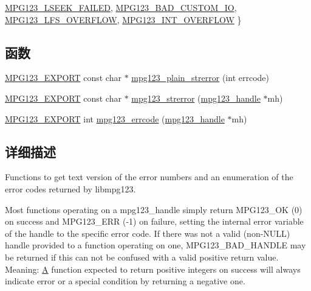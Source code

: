 \begin{DoxyCompactItemize}
\newline
\hyperlink{group__mpg123__error_ggac50432012aeaf7c23014de3198dfa5fda102bd78ff1fad6cce594e22ea6fb0698}{M\+P\+G123\+\_\+\+L\+S\+E\+E\+K\+\_\+\+F\+A\+I\+L\+ED}, 
\hyperlink{group__mpg123__error_ggac50432012aeaf7c23014de3198dfa5fda9968b3ba91db9dd166fa8421572bda52}{M\+P\+G123\+\_\+\+B\+A\+D\+\_\+\+C\+U\+S\+T\+O\+M\+\_\+\+IO}, 
\hyperlink{group__mpg123__error_ggac50432012aeaf7c23014de3198dfa5fda7ecc133213daa350d801a9e1dc3028e3}{M\+P\+G123\+\_\+\+L\+F\+S\+\_\+\+O\+V\+E\+R\+F\+L\+OW}, 
\hyperlink{group__mpg123__error_ggac50432012aeaf7c23014de3198dfa5fda29cadbffa0da2fc28d1d83e59211b86e}{M\+P\+G123\+\_\+\+I\+N\+T\+\_\+\+O\+V\+E\+R\+F\+L\+OW}
 \}
\end{DoxyCompactItemize}
\subsection*{函数}
\begin{DoxyCompactItemize}
\item 
\hyperlink{mpg123_8h_a2ba98cfba3f760879df70e755b2a61cc}{M\+P\+G123\+\_\+\+E\+X\+P\+O\+RT} const char $\ast$ \hyperlink{group__mpg123__error_gacf2c837729218ae3681e3fdb03cda529}{mpg123\+\_\+plain\+\_\+strerror} (int errcode)
\item 
\hyperlink{mpg123_8h_a2ba98cfba3f760879df70e755b2a61cc}{M\+P\+G123\+\_\+\+E\+X\+P\+O\+RT} const char $\ast$ \hyperlink{group__mpg123__error_ga161acf171646d7ffce09446404cb0c21}{mpg123\+\_\+strerror} (\hyperlink{group__mpg123__init_ga6728e2839a395f3a07d4514da659faca}{mpg123\+\_\+handle} $\ast$mh)
\item 
\hyperlink{mpg123_8h_a2ba98cfba3f760879df70e755b2a61cc}{M\+P\+G123\+\_\+\+E\+X\+P\+O\+RT} int \hyperlink{group__mpg123__error_ga3fcb62b39c7ee3884b163aee0433df04}{mpg123\+\_\+errcode} (\hyperlink{group__mpg123__init_ga6728e2839a395f3a07d4514da659faca}{mpg123\+\_\+handle} $\ast$mh)
\end{DoxyCompactItemize}


\subsection{详细描述}
Functions to get text version of the error numbers and an enumeration of the error codes returned by libmpg123.

Most functions operating on a mpg123\+\_\+handle simply return M\+P\+G123\+\_\+\+OK (0) on success and M\+P\+G123\+\_\+\+E\+RR (-\/1) on failure, setting the internal error variable of the handle to the specific error code. If there was not a valid (non-\/\+N\+U\+LL) handle provided to a function operating on one, M\+P\+G123\+\_\+\+B\+A\+D\+\_\+\+H\+A\+N\+D\+LE may be returned if this can not be confused with a valid positive return value. Meaning\+: \hyperlink{struct_a}{A} function expected to return positive integers on success will always indicate error or a special condition by returning a negative one.

